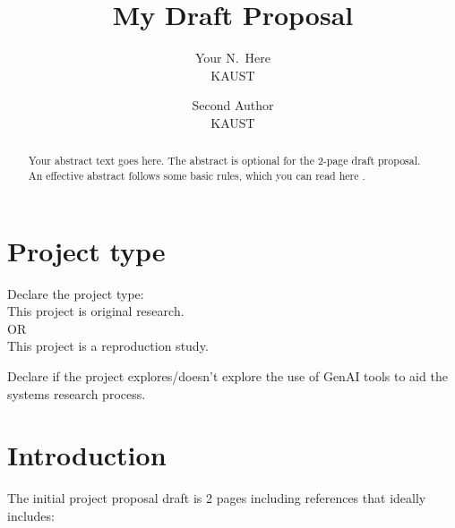 \documentclass[letterpaper,twocolumn,10pt]{article}
\begin{document}

\date{}


\title{\Large \bf My Draft Proposal}

\author{
{\rm Your N.\ Here}\\
KAUST
\and
{\rm Second Author}\\
KAUST
} %

\maketitle

\begin{abstract}
Your abstract text goes here. The abstract is optional for the 2-page draft proposal.
An effective abstract follows some basic rules, which you can read here \cite{john-wilkes-keynote}.
\end{abstract}

\section{Project type}

Declare the project type:\\
This project is original research.\\
OR\\
This project is a reproduction study.

Declare if the project explores/doesn't explore the use of GenAI tools to aid the systems research process.


\section{Introduction}

The initial project proposal draft is 2 pages including references that ideally includes:
\end{document}
